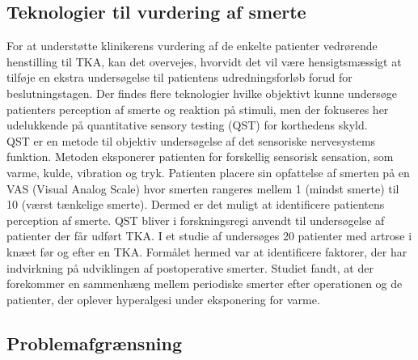 \subsection{Teknologier til vurdering af smerte}
For at understøtte klinikerens vurdering af de enkelte patienter vedrørende henstilling til TKA, kan det overvejes, hvorvidt det vil være hensigtsmæssigt at tilføje en ekstra undersøgelse til patientens udredningsforløb forud for beslutningstagen. %
Der findes flere teknologier hvilke objektivt kunne undersøge patienters perception af smerte og reaktion på stimuli, men der fokuseres her udelukkende på quantitative sensory testing (QST) for korthedens skyld. \\
QST er en metode til objektiv undersøgelse af det sensoriske nervesystems funktion. %
Metoden eksponerer patienten for forskellig sensorisk sensation, som varme, kulde, vibration og tryk. Patienten placere sin opfattelse af smerten på en VAS (Visual Analog Scale) hvor smerten rangeres mellem 1 (mindst smerte) til 10 (værst tænkelige smerte). Dermed er det muligt at identificere patientens perception af smerte.
QST bliver i forskningsregi anvendt til undersøgelse af patienter der får udført TKA. I et studie af  undersøges 20 patienter med artrose i knæet før og efter en TKA. Formålet hermed var at identificere faktorer, der har indvirkning på udviklingen af postoperative smerter. 
Studiet fandt, at der forekommer en sammenhæng mellem periodiske smerter efter operationen og de patienter, der oplever hyperalgesi under eksponering for varme. \citep{Martinez2007} 

\subsection{Problemafgrænsning}

